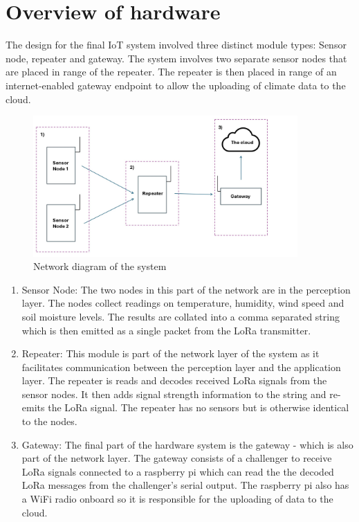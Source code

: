 \section{Overview of hardware}\label{sec:hardware-overview}

The design for the final IoT system involved three distinct module types: Sensor
node, repeater and gateway. The system involves two separate sensor nodes that
are placed in range of the repeater. The repeater is then placed in range of an
internet-enabled gateway endpoint to allow the uploading of climate data to the
cloud.

\begin{figure}[H]
    \centering
    \includegraphics[width=0.9\textwidth]{contents/part-2/fig2/network-diagram.jpg}
    \caption{Network diagram of the system}
    \label{fig:network-diagram}
\end{figure}

\begin{enumerate}
    \item Sensor Node: The two nodes in this part of the network are in the
          perception layer. The nodes collect readings on temperature, humidity,
          wind speed and soil moisture levels. The results are collated into a
          comma separated string which is then emitted as a single packet from
          the LoRa transmitter.
    \item Repeater: This module is part of the network layer of the system as it
          facilitates communication between the perception layer and the
          application layer. The repeater is reads and decodes received LoRa
          signals from the sensor nodes. It then adds signal strength
          information to the string and re-emits the LoRa signal. The repeater
          has no sensors but is otherwise identical to the nodes.
    \item Gateway: The final part of the hardware system is the gateway - which
          is also part of the network layer. The gateway consists of a
          challenger to receive LoRa signals connected to a raspberry pi which
          can read the the decoded LoRa messages from the challenger's serial
          output. The raspberry pi also has a WiFi radio onboard so it is
          responsible for the uploading of data to the cloud.
\end{enumerate}




